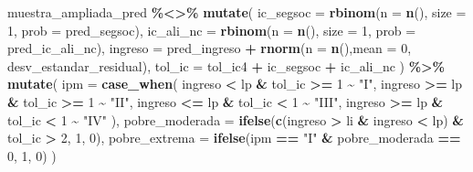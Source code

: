 \documentclass[
  12pt,
]{book}
\newenvironment{Shaded}{\begin{snugshade}}{\end{snugshade}}
\newcommand{\AttributeTok}[1]{\textcolor[rgb]{0.13,0.29,0.53}{#1}}
\newcommand{\DecValTok}[1]{\textcolor[rgb]{0.00,0.00,0.81}{#1}}
\newcommand{\FunctionTok}[1]{\textcolor[rgb]{0.13,0.29,0.53}{\textbf{#1}}}
\newcommand{\NormalTok}[1]{#1}
\newcommand{\SpecialCharTok}[1]{\textcolor[rgb]{0.81,0.36,0.00}{\textbf{#1}}}
\newcommand{\StringTok}[1]{\textcolor[rgb]{0.31,0.60,0.02}{#1}}
\begin{document}
\begin{Shaded}
\begin{Highlighting}[]
\NormalTok{  muestra\_ampliada\_pred }\SpecialCharTok{\%\textless{}\textgreater{}\%} 
    \FunctionTok{mutate}\NormalTok{(}
      \AttributeTok{ic\_segsoc =} \FunctionTok{rbinom}\NormalTok{(}\AttributeTok{n =} \FunctionTok{n}\NormalTok{(), }\AttributeTok{size =} \DecValTok{1}\NormalTok{, }\AttributeTok{prob =}\NormalTok{ pred\_segsoc),}
      \AttributeTok{ic\_ali\_nc =} \FunctionTok{rbinom}\NormalTok{(}\AttributeTok{n =} \FunctionTok{n}\NormalTok{(), }\AttributeTok{size =} \DecValTok{1}\NormalTok{, }\AttributeTok{prob =}\NormalTok{ pred\_ic\_ali\_nc),}
      \AttributeTok{ingreso =}\NormalTok{ pred\_ingreso }\SpecialCharTok{+} \FunctionTok{rnorm}\NormalTok{(}\AttributeTok{n =} \FunctionTok{n}\NormalTok{(),}\AttributeTok{mean =} \DecValTok{0}\NormalTok{,}
\NormalTok{                                     desv\_estandar\_residual),}
      \AttributeTok{tol\_ic =}\NormalTok{ tol\_ic4 }\SpecialCharTok{+}\NormalTok{ ic\_segsoc }\SpecialCharTok{+}\NormalTok{ ic\_ali\_nc}
\NormalTok{    ) }\SpecialCharTok{\%\textgreater{}\%} \FunctionTok{mutate}\NormalTok{(}
      \AttributeTok{ipm   =} \FunctionTok{case\_when}\NormalTok{(}
\NormalTok{        ingreso }\SpecialCharTok{\textless{}}\NormalTok{ lp  }\SpecialCharTok{\&}\NormalTok{  tol\_ic }\SpecialCharTok{\textgreater{}=} \DecValTok{1} \SpecialCharTok{\textasciitilde{}} \StringTok{"I"}\NormalTok{,}
\NormalTok{        ingreso }\SpecialCharTok{\textgreater{}=}\NormalTok{ lp }\SpecialCharTok{\&}\NormalTok{ tol\_ic }\SpecialCharTok{\textgreater{}=} \DecValTok{1} \SpecialCharTok{\textasciitilde{}} \StringTok{"II"}\NormalTok{,}
\NormalTok{        ingreso }\SpecialCharTok{\textless{}=}\NormalTok{ lp }\SpecialCharTok{\&}\NormalTok{ tol\_ic }\SpecialCharTok{\textless{}} \DecValTok{1} \SpecialCharTok{\textasciitilde{}} \StringTok{"III"}\NormalTok{,}
\NormalTok{        ingreso }\SpecialCharTok{\textgreater{}=}\NormalTok{ lp }\SpecialCharTok{\&}\NormalTok{ tol\_ic }\SpecialCharTok{\textless{}} \DecValTok{1} \SpecialCharTok{\textasciitilde{}} \StringTok{"IV"}
\NormalTok{      ),}
      \AttributeTok{pobre\_moderada =} \FunctionTok{ifelse}\NormalTok{(}\FunctionTok{c}\NormalTok{(ingreso }\SpecialCharTok{\textgreater{}}\NormalTok{ li }\SpecialCharTok{\&}\NormalTok{ ingreso }\SpecialCharTok{\textless{}}\NormalTok{ lp) }\SpecialCharTok{\&}
\NormalTok{                                tol\_ic }\SpecialCharTok{\textgreater{}} \DecValTok{2}\NormalTok{, }\DecValTok{1}\NormalTok{, }\DecValTok{0}\NormalTok{),}
      \AttributeTok{pobre\_extrema =} \FunctionTok{ifelse}\NormalTok{(ipm }\SpecialCharTok{==} \StringTok{"I"} \SpecialCharTok{\&}\NormalTok{ pobre\_moderada }\SpecialCharTok{==} \DecValTok{0}\NormalTok{, }\DecValTok{1}\NormalTok{, }\DecValTok{0}\NormalTok{)}
\NormalTok{    )  }


\end{Highlighting}
\end{Shaded}
\end{document}

